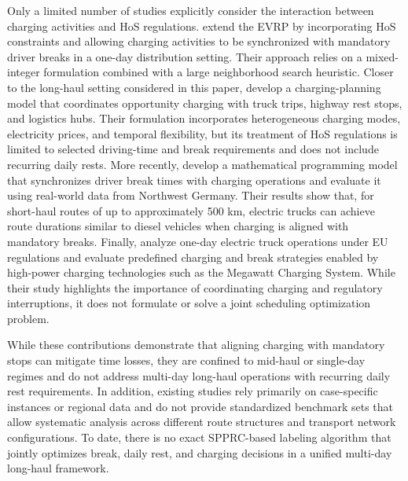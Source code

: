 \documentclass[3p,11pt,authoryear]{elsarticle}  %
\begin{document}
Only a limited number of studies explicitly consider the interaction between charging activities and HoS regulations. \citet{schiffer2017impact} extend the EVRP by incorporating HoS constraints and allowing charging activities to be synchronized with mandatory driver breaks in a one-day distribution setting. Their approach relies on a mixed-integer formulation combined with a large neighborhood search heuristic. Closer to the long-haul setting considered in this paper, \citet{wan2024longhaul} develop a charging-planning model that coordinates opportunity charging with truck trips, highway rest stops, and logistics hubs. Their formulation incorporates heterogeneous charging modes, electricity prices, and temporal flexibility, but its treatment of HoS regulations is limited to selected driving-time and break requirements and does not include recurring daily rests. More recently, \citet{brockmann2025breakandcharge} develop a mathematical programming model that synchronizes driver break times with charging operations and evaluate it using real-world data from Northwest Germany. Their results show that, for short-haul routes of up to approximately 500 km, electric trucks can achieve route durations similar to diesel vehicles when charging is aligned with mandatory breaks. Finally, \citet{schneider2023novel} analyze one-day electric truck operations under EU regulations and evaluate predefined charging and break strategies enabled by high-power charging technologies such as the Megawatt Charging System. While their study highlights the importance of coordinating charging and regulatory interruptions, it does not formulate or solve a joint scheduling optimization problem.


While these contributions demonstrate that aligning charging with mandatory stops can mitigate time losses, they are confined to mid-haul or single-day regimes and do not address multi-day long-haul operations with recurring daily rest requirements. In addition, existing studies rely primarily on case-specific instances or regional data and do not provide standardized benchmark sets that allow systematic analysis across different route structures and transport network configurations. To date, there is no exact SPPRC-based labeling algorithm that jointly optimizes break, daily rest, and charging decisions in a unified multi-day long-haul framework.
\end{document}
